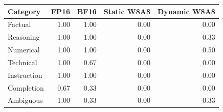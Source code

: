 \begin{tabular}{lrrrr}
\toprule
Category & FP16 & BF16 & Static W8A8 & Dynamic W8A8 \\
\midrule
Factual & 1.00 & 1.00 & 0.00 & 0.00 \\
Reasoning & 1.00 & 1.00 & 0.00 & 0.33 \\
Numerical & 1.00 & 1.00 & 0.00 & 0.50 \\
Technical & 1.00 & 0.67 & 0.00 & 0.00 \\
Instruction & 1.00 & 1.00 & 0.00 & 0.00 \\
Completion & 0.67 & 0.33 & 0.00 & 0.00 \\
Ambiguous & 1.00 & 0.33 & 0.00 & 0.33 \\
\bottomrule
\end{tabular}
